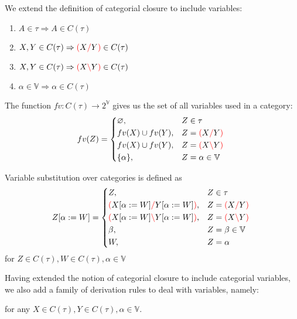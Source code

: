 \documentclass[main.tex]{subfiles}
\begin{document}
\begin{defn}
    We extend the definition of categorial closure to include variables:
    \begin{enumerate}
        \item \label{cvar:atomic} $A \in \tau \Rightarrow A \in C(\tau)$
        \item \label{cvar:right}  $X, Y \in C(\tau) \Rightarrow \textcolor{red}{(} X \textcolor{red}{/} Y \textcolor{red}{)} \in C(\tau)$
        \item \label{cvar:left}   $X, Y \in C(\tau) \Rightarrow \textcolor{red}{(} X \textcolor{red}{\backslash} Y \textcolor{red}{)} \in C(\tau)$
        \item \label{cvar:var}    $\alpha \in \mathbb{V} \Rightarrow \alpha \in C(\tau)$
    \end{enumerate}
\end{defn}

\begin{defn}
    The function $fv: C(\tau) \rightarrow 2^{\mathbb{V}}$ gives us the set of
    all variables used in a category:
    \[
        fv(Z) =
        \begin{cases*}
            \varnothing, & $Z \in \tau$ \\
            fv(X) \cup fv(Y), & $Z = \lp X \rc Y \rp$ \\
            fv(X) \cup fv(Y), & $Z = \lp X \lc Y \rp$ \\
            \{ \alpha \}, & $Z = \alpha \in \mathbb{V}$ \\
        \end{cases*}
    \]
\end{defn}
\begin{defn}
    Variable substitution over categories is defined as
    \[
        \subst{Z}{\alpha}{W} =
        \begin{cases*}
            Z, & $Z \in \tau$ \\
            \lp \subst{X}{\alpha}{W} \rc \subst{Y}{\alpha}{W} \rp, & $Z = \lp X \rc Y \rp$ \\
            \lp \subst{X}{\alpha}{W} \lc \subst{Y}{\alpha}{W} \rp, & $Z = \lp X \lc Y \rp$ \\
            \beta, & $Z = \beta \in \mathbb{V}$ \\
            W, & $Z = \alpha$ \\
        \end{cases*}
    \]
    for $Z \in C(\tau), W \in C(\tau), \alpha \in \mathbb{V}$
\end{defn}

Having extended the notion of categorial closure to include categorial variables,
we also add a family of derivation rules to deal with variables, namely:
\begin{center}
\end{center}
for any $X \in C(\tau), Y \in C(\tau), \alpha \in \mathbb{V}$.
\end{document}
